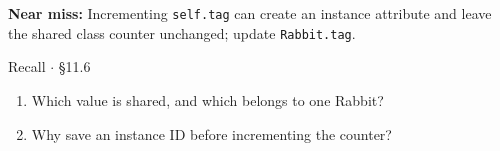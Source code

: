 \documentclass[11pt]{article}
\begin{document}
\begin{keepsection}
\begin{notebox}\textbf{Near miss:} Incrementing \texttt{self.tag} can create an instance attribute and leave the shared class counter unchanged; update \texttt{Rabbit.tag}.\end{notebox}

\begin{recallbox}{Recall \ensuremath{\cdot} §11.6}
\begin{enumerate}
\item Which value is shared, and which belongs to one Rabbit?
\item Why save an instance ID before incrementing the counter?
\end{enumerate}

\end{recallbox}
\end{keepsection}
\end{document}

